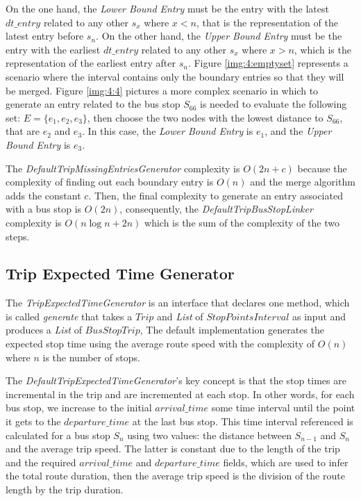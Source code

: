 On the one hand, the {\em Lower Bound Entry} must be the entry with the latest $dt\_entry$
related to any other $s_{x}$ where $x < n$, that is the representation of 
the latest entry before $s_n$. On the other hand, the {\em Upper Bound Entry} 
must be the entry with the earliest $dt\_entry$ related 
to any other $s_{x}$ where $x > n$, which is the representation of 
the earliest entry after $s_n$. Figure \ref{img:4:emptyset} represents a scenario 
where the interval contains only the boundary entries so that they will be merged. Figure \ref{img:4:4} pictures a more complex scenario
in which to generate an entry related to the bus stop $S_{66}$ is needed to evaluate
the following set: $E = \{{e_1, e_2, e_3}\}$, then choose the two nodes with
the lowest distance to $S_{66}$, that are $e_2$ and $e_3$. In this case,
the {\em Lower Bound Entry} is $e_1$, and the {\em Upper Bound Entry} is $e_3$.

The \textit{DefaultTripMissingEntriesGenerator} complexity is $O(2n + c)$ because
the complexity of finding out each boundary entry is $O(n)$ and 
the merge algorithm adds the constant $c$. Then, the final complexity to 
generate an entry associated with a bus stop is $O(2n)$, consequently,
the \textit{DefaultTripBusStopLinker} complexity is $O(n \log n + 2n)$ which 
is the sum of the complexity of the two steps.




\subsection{Trip Expected Time Generator}
The \textit{TripExpectedTimeGenerator} is an interface that declares one method, which is called
\textit{generate} that takes a $Trip$ and \textit{List} of $StopPointsInterval$ as input 
and produces a \textit{List} of $BusStopTrip$, The default implementation generates the expected stop time using
the average route speed with the complexity of $O(n)$ where $n$ is
the number of stops. 

The \textit{DefaultTripExpectedTimeGenerator}'s key concept is that the stop times are incremental in the trip
and are incremented at each stop. In other words, for each bus stop, we increase to the initial $arrival\_time$ some time interval until the point it gets to the $departure\_time$ at the last bus stop. 
This time interval referenced is calculated for a bus stop 
$S_n$ using two values: 
the distance between $S_{n-1}$ and $S_n$ and the average trip speed.
The latter is constant due to the length of the trip and 
the required $arrival\_time$ and $departure\_time$ fields, which are used to infer the total
route duration, then the average trip speed is the division of the route length by the trip duration.

